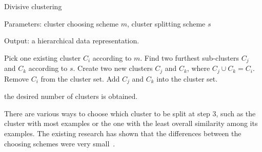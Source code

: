 \begin{algorithm}[ht!]
	\caption{Divisive clustering}
    
    Parameters: cluster choosing scheme $m$, cluster splitting scheme $s$
    
    Output: a hierarchical data representation.
    
	\begin{algorithmic}[1] 
		
        \REPEAT
		
		
		\STATE Pick one existing cluster $C_i$ according to $m$.
		\STATE Find two furthest sub-clusters $C_j$ and $C_k$ according to $s$.  
		\STATE Create two new clusters $C_j$ and $C_k$, where $C_j \cup C_k = C_i$. 
		\STATE Remove $C_i$ from the cluster set. 
		\STATE Add $C_j$ and $C_k$ into the cluster set. 
				
		\UNTIL the desired number of clusters is obtained.
		
	\end{algorithmic}
	
\end{algorithm}

There are various ways to choose which cluster to be split at step 3, such as the cluster with most examples or the one with the least overall similarity among its examples. The existing research has shown that the differences between the choosing schemes were very small~\cite{Steinbach2000}. 


